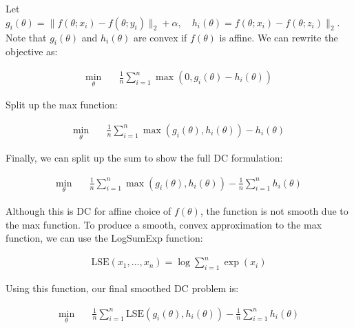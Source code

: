 \documentclass[11pt]{article}
\begin{document}
Let $g_i(\theta) = \| f(\theta; x_i) - f(\theta; y_i)\|_2 + \alpha, \quad h_i(\theta) = f(\theta; x_i) - f(\theta; z_i)\|_2$. Note that $g_i(\theta)$ and $h_i(\theta)$ are convex if $f(\theta)$ is affine. We can rewrite the objective as:

\begin{equation}
\begin{aligned}
    \min_{\theta} \quad & \frac{1}{n} \sum_{i=1}^{n} \max(0, g_i(\theta) - h_i(\theta))
\end{aligned}
\end{equation}

Split up the max function:

\begin{equation}
\begin{aligned}
    \min_{\theta} \quad & \frac{1}{n} \sum_{i=1}^{n} \max(g_i(\theta), h_i(\theta)) - h_i(\theta)
\end{aligned}
\end{equation}

Finally, we can split up the sum to show the full DC formulation:

\begin{equation}
\begin{aligned}
    \min_{\theta} \quad & \frac{1}{n} \sum_{i=1}^{n} \max(g_i(\theta), h_i(\theta)) - \frac{1}{n} \sum_{i=1}^{n} h_i(\theta)
\end{aligned}
\end{equation}

Although this is DC for affine choice of $f(\theta)$, the function is not smooth due to the max function. To produce a smooth, convex approximation to the max function, we can use the LogSumExp function:

\begin{equation}
\begin{aligned}
\textrm{LSE}(x_1, ..., x_n) = \log\sum_{i=1}^{n} \exp(x_i)
\end{aligned}
\end{equation}

Using this function, our final smoothed DC problem is:

\begin{equation}
\begin{aligned}
    \min_{\theta} \quad & \frac{1}{n} \sum_{i=1}^{n} \textrm{LSE}(g_i(\theta), h_i(\theta)) - \frac{1}{n} \sum_{i=1}^{n} h_i(\theta)
\end{aligned}
\end{equation}
\end{document}
